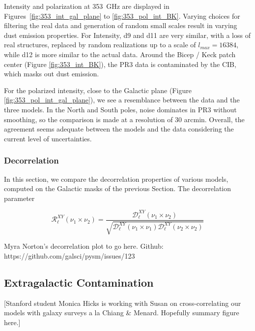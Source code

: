 \documentclass[twocolumn]{aastex631}
\begin{document}
Intensity and polarization at 353~GHz are displayed in Figures~\ref{fig:353_int_gal_plane} to \ref{fig:353_pol_int_BK}. Varying choices for filtering the real data and generation of random small scales result in varying dust emission properties. For Intensity, d9 and d11 are very similar, with a loss of real structures, replaced by random realizations up to a scale of $l_{max} = 16384$, while d12 is more similar to the actual data. 
Around the Bicep / Keck patch center (Figure \ref{fig:353_int_BK}), the PR3 data is contaminated by the CIB, which masks out dust emission. 

For the polarized intensity, close to the Galactic plane (Figure \ref{fig:353_pol_int_gal_plane}), we see a resemblance between the data and the three models. In the North and South poles, noise dominates in PR3 without smoothing, so the comparison is made at a resolution of 30 arcmin. Overall, the agreement seems adequate between the models and the data considering the current level of uncertainties. 


\subsubsection{Decorrelation} \label{sec:decorrelation}

In this section, we compare the decorrelation properties of various models, computed on the Galactic masks of the previous Section. The decorrelation parameter

\begin{equation}
    \mathcal{R}^{XY}_\ell(\nu_1\times\nu_2) = \frac{\mathcal{D}_\ell^{XY}(\nu_1\times\nu_2)}{\sqrt{\mathcal{D}_\ell^{XY}(\nu_1\times\nu_1)\mathcal{D}_\ell^{XY}(\nu_2\times\nu_2)}}
\end{equation}

Myra Norton's decorrelation plot to go here. Github: https://github.com/galsci/pysm/issues/123

\subsection{Extragalactic Contamination} \label{sec:CIBcontamination}

[Stanford student Monica Hicks is working with Susan on cross-correlating our models with galaxy surveys a la Chiang \& Menard. Hopefully summary figure here.] 
\end{document}
